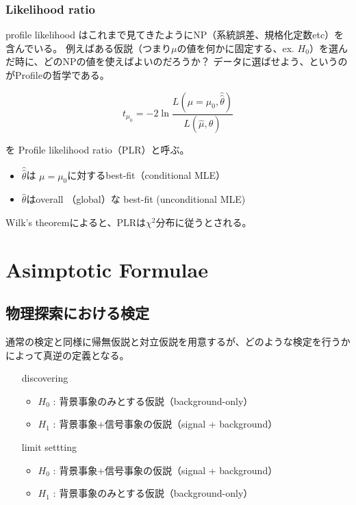 \subsection{Likelihood ratio}
profile likelihood はこれまで見てきたようにNP（系統誤差、規格化定数etc）を含んでいる。
例えばある仮説（つまり$\mu$の値を何かに固定する、ex. $H_0$）を選んだ時に、どのNPの値を使えばよいのだろうか？
データに選ばせよう、というのがProfileの哲学である。

\begin{equation}
t_{\mu_0} =  -2 \ln\frac{L(\mu=\mu_0,\hat{\hat{\theta}})}{L(\hat{\mu},\hat{\theta})}
\end{equation}

を Profile likelihood ratio（PLR）と呼ぶ。

\begin{itemize}
  \item $\hat{\hat{\theta}}$は $\mu=\mu_0$に対するbest-fit（conditional MLE）
  \item $\hat{\theta}$はoverall （global）な best-fit (unconditional MLE)
\end{itemize}

Wilk's theoremによると、PLRは$\chi^2$分布に従うとされる。


\chapter{Asimptotic Formulae}

\section{物理探索における検定}

通常の検定と同様に帰無仮説と対立仮説を用意するが、どのような検定を行うかによって真逆の定義となる。

\begin{itemize}
  \item[discovering]\mbox{}\\
    \begin{itemize}
      \item $H_0$ : 背景事象のみとする仮説（background-only）
      \item $H_1$ : 背景事象+信号事象の仮説（signal + background）
    \end{itemize}
  \item[limit settting]\mbox{}\\
    \begin{itemize}
      \item $H_0$ : 背景事象+信号事象の仮説（signal + background）
      \item $H_1$ : 背景事象のみとする仮説（background-only）
    \end{itemize}
\end{itemize}

